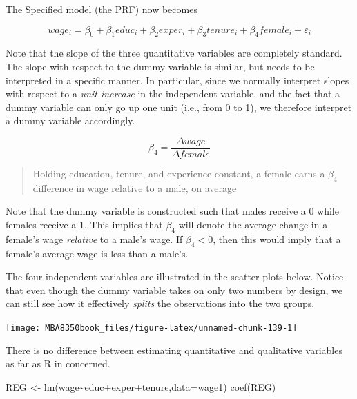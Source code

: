 \documentclass[
]{book}
\newenvironment{Shaded}{\begin{snugshade}}{\end{snugshade}}
\newcommand{\AttributeTok}[1]{\textcolor[rgb]{0.77,0.63,0.00}{#1}}
\newcommand{\FunctionTok}[1]{\textcolor[rgb]{0.00,0.00,0.00}{#1}}
\newcommand{\NormalTok}[1]{#1}
\newcommand{\OtherTok}[1]{\textcolor[rgb]{0.56,0.35,0.01}{#1}}
\newcommand{\SpecialCharTok}[1]{\textcolor[rgb]{0.00,0.00,0.00}{#1}}
\begin{document}
The Specified model (the PRF) now becomes

\[wage_i=\beta_0+\beta_1educ_i+\beta_2exper_i+\beta_3tenure_i+\beta_4female_i+\varepsilon_i\]

Note that the slope of the three quantitative variables are completely standard. The slope with respect to the dummy variable is similar, but needs to be interpreted in a specific manner. In particular, since we normally interpret slopes with respect to a \emph{unit increase} in the independent variable, and the fact that a dummy variable can only go up one unit (i.e., from 0 to 1), we therefore interpret a dummy variable accordingly.

\[\beta_4 = \frac{\Delta wage}{\Delta female}\]

\begin{quote}
Holding education, tenure, and experience constant, a female earns a \(\beta_4\) difference in wage relative to a male, on average
\end{quote}

Note that the dummy variable is constructed such that males receive a 0 while females receive a 1. This implies that \(\beta_4\) will denote the average change in a female's wage \emph{relative} to a male's wage. If \(\beta_4 < 0\), then this would imply that a female's average wage is less than a male's.

The four independent variables are illustrated in the scatter plots below. Notice that even though the dummy variable takes on only two numbers by design, we can still see how it effectively \emph{splits} the observations into the two groups.

\begin{center}\texttt{[image: MBA8350book\_files/figure-latex/unnamed-chunk-139-1]} \end{center}

There is no difference between estimating quantitative and qualitative variables as far as R in concerned.

\begin{Shaded}
\begin{Highlighting}[]
\NormalTok{REG }\OtherTok{\textless{}{-}} \FunctionTok{lm}\NormalTok{(wage}\SpecialCharTok{\textasciitilde{}}\NormalTok{educ}\SpecialCharTok{+}\NormalTok{exper}\SpecialCharTok{+}\NormalTok{tenure,}\AttributeTok{data=}\NormalTok{wage1)}
\FunctionTok{coef}\NormalTok{(REG)}
\end{Highlighting}
\end{Shaded}
\end{document}

